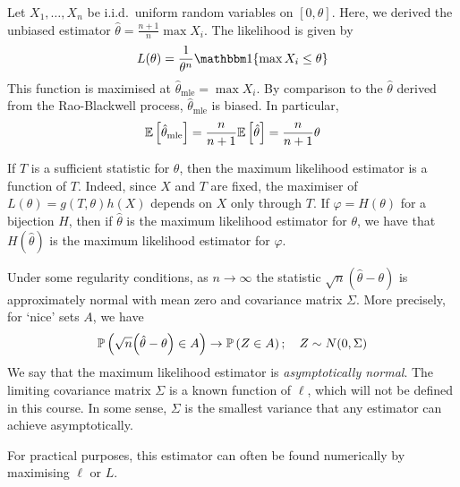 \begin{example}
	Let \( X_1, \dots, X_n \) be i.i.d.\ uniform random variables on \( [0,\theta] \).
	Here, we derived the unbiased estimator \( \hat \theta = \frac{n+1}{n} \max X_i \).
	The likelihood is given by
	\[
		L(\theta) = \frac{1}{\theta^n} \mathbbm 1\qty{\max X_i \leq \theta}
	\]
	This function is maximised at \( \hat \theta_{\mathrm{mle}} = \max X_i \).
	By comparison to the \( \hat \theta \) derived from the Rao-Blackwell process, \( \hat \theta_{\mathrm{mle}} \) is biased.
	In particular,
	\[
		\mathbb{E}\left[{\hat \theta_{\mathrm{mle}}}\right] = \frac{n}{n+1} \mathbb{E}\left[{\hat \theta}\right] = \frac{n}{n+1} \theta
	\]
\end{example}
\begin{remark}
	If \( T \) is a sufficient statistic for \( \theta \), then the maximum likelihood estimator is a function of \( T \).
	Indeed, since \( X \) and \( T \) are fixed, the maximiser of \( L(\theta) = g(T,\theta) h(X) \) depends on \( X \) only through \( T \).
	If \( \varphi = H(\theta) \) for a bijection \( H \), then if \( \hat \theta \) is the maximum likelihood estimator for \( \theta \), we have that \( H(\hat \theta) \) is the maximum likelihood estimator for \( \varphi \).

	Under some regularity conditions, as \( n \to \infty \) the statistic \( \sqrt{n} (\hat \theta - \theta) \) is approximately normal with mean zero and covariance matrix \( \Sigma \).
	More precisely, for `nice' sets \( A \), we have
	\[
		\mathbb{P}\left({\sqrt{n} \qty(\hat \theta - \theta) \in A}\right) \to \mathbb{P}\left({Z \in A}\right);\quad Z \sim N(0, \Sigma)
	\]
	We say that the maximum likelihood estimator is \textit{asymptotically normal}.
	The limiting covariance matrix \( \Sigma \) is a known function of \( \ell \), which will not be defined in this course.
	In some sense, \( \Sigma \) is the smallest variance that any estimator can achieve asymptotically.

	For practical purposes, this estimator can often be found numerically by maximising \( \ell \) or \( L \).
\end{remark}
